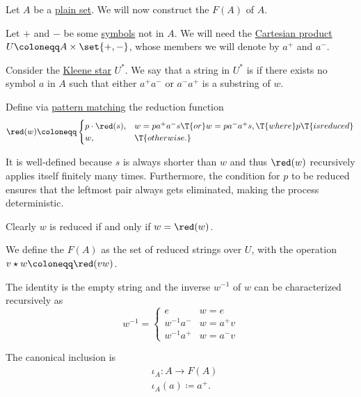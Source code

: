 \begin{definition}\label{def:free_group}\mimprovised
  Let \( A \) be a \hyperref[def:set]{plain set}. We will now construct the  \( F(A) \) of \( A \).

  Let \( + \) and \( - \) be some \hyperref[def:formal_language/symbol]{symbols} not in \( A \). We will need the \hyperref[def:cartesian_product]{Cartesian product} \( U \coloneqq A \times \set{ +, - } \), whose members we will denote by \( a^+ \) and \( a^- \).

  Consider the \hyperref[def:formal_language/kleene_star]{Kleene star} \( U^* \). We say that a string in \( U^* \) is  if there exists no symbol \( a \) in \( A \) such that either \( a^+ a^- \) or \( a^- a^+ \) is a substring of \( w \).

  Define via \hyperref[con:evaluation]{pattern matching} the reduction function
  \begin{equation}\label{eq:def:free_group/reduction}
    \red(w) \coloneqq \begin{cases}
      p \cdot \red(s), &w = p a^+ a^- s \T{or} w = p a^- a^+ s, \T{where} p \T{is reduced} \\
      w,               &\T{otherwise.}
    \end{cases}
  \end{equation}

  It is well-defined because \( s \) is always shorter than \( w \) and thus \( \red(w) \) recursively applies itself finitely many times. Furthermore, the condition for \( p \) to be reduced ensures that the leftmost pair always gets eliminated, making the process deterministic.

  Clearly \( w \) is reduced if and only if \( w = \red(w) \).

  We define the  \( F(A) \) as the set of reduced strings over \( U \), with the operation \( v \star w \coloneqq \red(vw) \).

  The identity is the empty string and the inverse \( w^{-1} \) of \( w \) can be characterized recursively as
  \begin{equation*}
    w^{-1} = \begin{cases}
      e          &w = e \\
      w^{-1} a^- &w = a^+ v \\
      w^{-1} a^+ &w = a^- v
    \end{cases}
  \end{equation*}

  The canonical inclusion is
  \begin{equation*}
    \begin{aligned}
      &\iota_A: A \to F(A) \\
      &\iota_A(a) \coloneqq a^+.
    \end{aligned}
  \end{equation*}
\end{definition}
